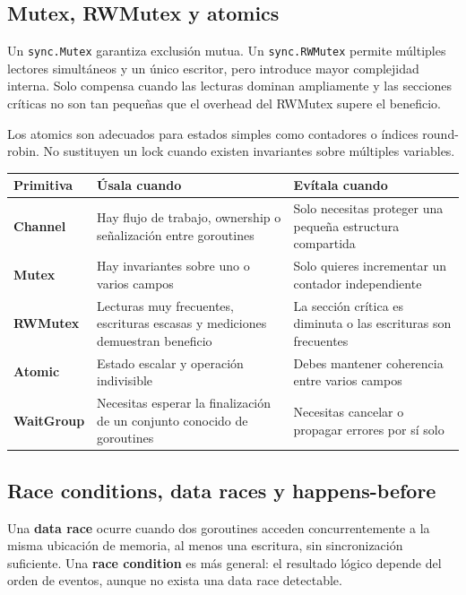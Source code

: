 \documentclass[11pt,a4paper]{article}
\newcommand{\code}[1]{\texttt{#1}}
\begin{document}
\subsection{Mutex, RWMutex y atomics}

Un \code{sync.Mutex} garantiza exclusión mutua. Un \code{sync.RWMutex} permite múltiples lectores simultáneos y un único escritor, pero introduce mayor complejidad interna. Solo compensa cuando las lecturas dominan ampliamente y las secciones críticas no son tan pequeñas que el overhead del RWMutex supere el beneficio.

Los atomics son adecuados para estados simples como contadores o índices round-robin. No sustituyen un lock cuando existen invariantes sobre múltiples variables.

\begin{table}[h]
\centering
\small
\begin{tabularx}{\textwidth}{>{\bfseries}p{2.8cm} X X}
\toprule
Primitiva & Úsala cuando & Evítala cuando \\
\midrule
Channel & Hay flujo de trabajo, ownership o señalización entre goroutines & Solo necesitas proteger una pequeña estructura compartida \\
Mutex & Hay invariantes sobre uno o varios campos & Solo quieres incrementar un contador independiente \\
RWMutex & Lecturas muy frecuentes, escrituras escasas y mediciones demuestran beneficio & La sección crítica es diminuta o las escrituras son frecuentes \\
Atomic & Estado escalar y operación indivisible & Debes mantener coherencia entre varios campos \\
WaitGroup & Necesitas esperar la finalización de un conjunto conocido de goroutines & Necesitas cancelar o propagar errores por sí solo \\
\bottomrule
\end{tabularx}
\end{table}

\subsection{Race conditions, data races y happens-before}

Una \textbf{data race} ocurre cuando dos goroutines acceden concurrentemente a la misma ubicación de memoria, al menos una escritura, sin sincronización suficiente. Una \textbf{race condition} es más general: el resultado lógico depende del orden de eventos, aunque no exista una data race detectable.
\end{document}
